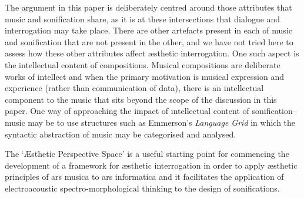 \documentclass{article}
\begin{document}
The argument in this paper is deliberately centred around those attributes that music and sonification share, as it is at these intersections that dialogue and interrogation may take place. There are other artefacts present in each of music and sonification that are not present in the other, and we have not tried here to assess how these other attributes affect æsthetic interrogation. One such aspect is the intellectual content of compositions. Musical compositions are deliberate works of intellect and when the primary motivation is musical expression and experience (rather than communication of data), there is an intellectual component to the music that sits beyond the scope of the discussion in this paper. One way of approaching the impact of intellectual content of sonification--music may be to  use structures such as Emmerson's {\it Language Grid} \cite{Emmerson:1986} in which the syntactic abstraction of music may be categorised and analysed. 

The `Æsthetic Perspective Space' is a useful starting point for commencing the development of a framework for æsthetic interrogation in order to apply æsthetic principles of ars musica to ars informatica and it facilitates the application of electroacoustic spectro-morphological thinking to the design of sonifications. 
\end{document}

